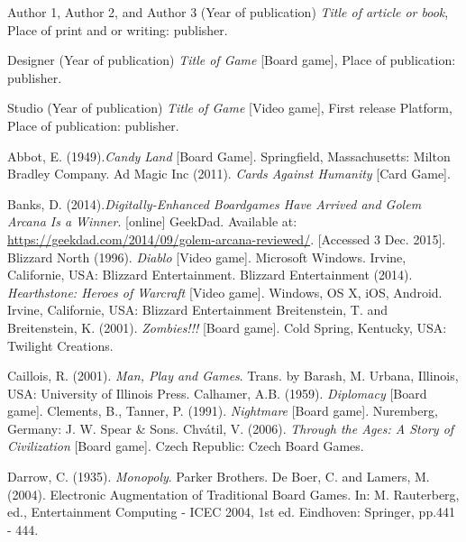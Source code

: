 \documentclass[a4paper,11pt]{article}
\begin{document}
\pagebreak
%
\begin{thebibliography}{1}

Author 1, Author 2, and Author 3 (Year of publication) \emph{Title of article or book}, Place of print and or writing: publisher.

Designer (Year of publication) \emph{Title of Game} [Board game], Place of publication: publisher.

Studio (Year of publication) \emph{Title of Game} [Video game],  First release Platform, Place of publication: publisher.

Abbot, E. (1949).\textit{Candy Land} [Board Game]. Springfield, Massachusetts: Milton Bradley Company.
Ad Magic Inc (2011). \textit{Cards Against Humanity} [Card Game].

Banks, D. (2014).\textit{Digitally-Enhanced Boardgames Have Arrived and Golem Arcana Is a Winner}. [online] GeekDad. Available at: \url{https://geekdad.com/2014/09/golem-arcana-reviewed/}. [Accessed 3 Dec. 2015].
Blizzard North (1996). \textit{Diablo} [Video game]. Microsoft Windows. Irvine, Californie, USA: Blizzard Entertainment.
Blizzard Entertainment (2014). \textit{Hearthstone: Heroes of Warcraft} [Video game]. Windows, OS X, iOS, Android.  Irvine, Californie, USA: Blizzard Entertainment
Breitenstein, T. and Breitenstein, K. (2001). \textit{Zombies!!!} [Board game]. Cold Spring, Kentucky, USA: Twilight Creations.

Caillois, R. (2001). \textit{Man, Play and Games}. Trans. by Barash, M. Urbana, Illinois, USA: University of Illinois Press.
Calhamer, A.B. (1959). \textit{Diplomacy} [Board game].
Clements, B., Tanner, P. (1991). \textit{Nightmare} [Board game]. Nuremberg, Germany: J. W. Spear \& Sons.
Chvátil, V. (2006). \textit{Through the Ages: A Story of Civilization} [Board game]. Czech Republic: Czech Board Games.

Darrow, C. (1935). \textit{Monopoly}. Parker Brothers.
De Boer, C. and Lamers, M. (2004). Electronic Augmentation of Traditional Board Games. In: M. Rauterberg, ed., Entertainment Computing - ICEC 2004, 1st ed. Eindhoven: Springer, pp.441 - 444.


\end{thebibliography}
\end{document}
